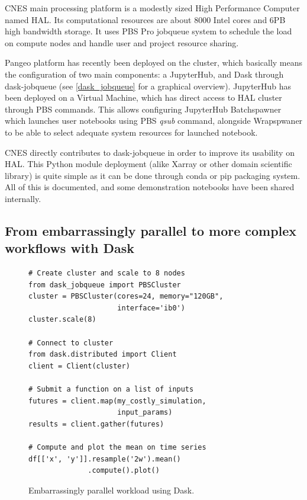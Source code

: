 \documentclass{article}
\begin{document}
CNES main processing platform is a modestly sized High Performance Computer named HAL. Its computational resources are about 8000 Intel cores and 6PB high bandwidth storage. It uses PBS Pro jobqueue system to schedule the load on compute nodes and handle user and project resource sharing.

Pangeo platform has recently been deployed on the cluster, which basically means the configuration of two main components: a JupyterHub, and Dask through dask-jobqueue (see \ref{dask_jobqueue} for a graphical overview). JupyterHub has been deployed on a Virtual Machine, which has direct access to HAL cluster through PBS commands. This allows configuring JupyterHub Batchspawner which launches user notebooks using PBS \textit{qsub} command, alongside Wrapspwaner to be able to select adequate system resources for launched notebook.

CNES directly contributes to dask-jobqueue in order to improve its usability on HAL. This Python module deployment (alike Xarray or other domain scientific library) is quite simple as it can be done through conda or pip packaging system. All of this is documented, and some demonstration notebooks have been shared internally.

\subsection{From embarrassingly parallel to more complex workflows with Dask}
\label{ssec:usecase1}

\begin{figure}
\begin{verbatim}
# Create cluster and scale to 8 nodes
from dask_jobqueue import PBSCluster
cluster = PBSCluster(cores=24, memory="120GB", 
                     interface='ib0')
cluster.scale(8)

# Connect to cluster
from dask.distributed import Client
client = Client(cluster)

# Submit a function on a list of inputs
futures = client.map(my_costly_simulation, 
                     input_params)
results = client.gather(futures)

# Compute and plot the mean on time series
df[['x', 'y']].resample('2w').mean()
              .compute().plot()
\end{verbatim}
\caption{\label{ep_dask_code} Embarrassingly parallel workload using Dask.}
\end{figure}
\end{document}
